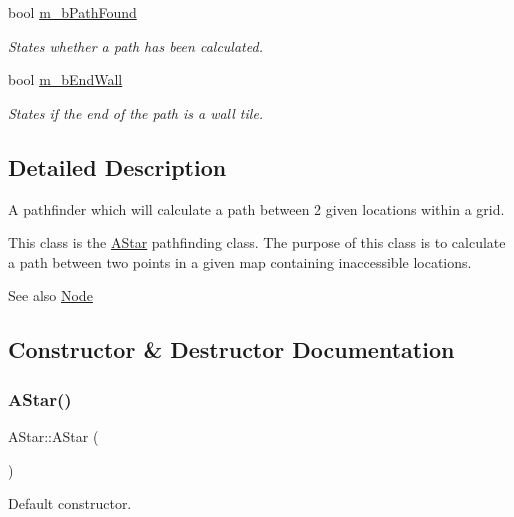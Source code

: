 \begin{DoxyCompactItemize}
bool \hyperlink{class_a_star_a16ef2dc0a317f629702153f79efdc7bd}{m\+\_\+b\+Path\+Found}
\begin{DoxyCompactList}\small\item\em States whether a path has been calculated. \end{DoxyCompactList}\item 
bool \hyperlink{class_a_star_a4121e9b5155fdadce3add355279d9ed7}{m\+\_\+b\+End\+Wall}
\begin{DoxyCompactList}\small\item\em States if the end of the path is a wall tile. \end{DoxyCompactList}\end{DoxyCompactItemize}


\subsection{Detailed Description}
A pathfinder which will calculate a path between 2 given locations within a grid. 

This class is the \hyperlink{class_a_star}{A\+Star} pathfinding class. The purpose of this class is to calculate a path between two points in a given map containing inaccessible locations. \begin{DoxySeeAlso}{See also}
\hyperlink{struct_node}{Node} 
\end{DoxySeeAlso}


\subsection{Constructor \& Destructor Documentation}
\mbox{\label{class_a_star_ab7cfaf9e1662f45f5fdce245d28c4508}} 
\subsubsection{\texorpdfstring{A\+Star()}{AStar()}}
{\footnotesize\ttfamily A\+Star\+::\+A\+Star (\begin{DoxyParamCaption}{ }\end{DoxyParamCaption})}



Default constructor. 

\mbox{\label{class_a_star_ad246668465621db8818bbe3511fa4ae7}} 
